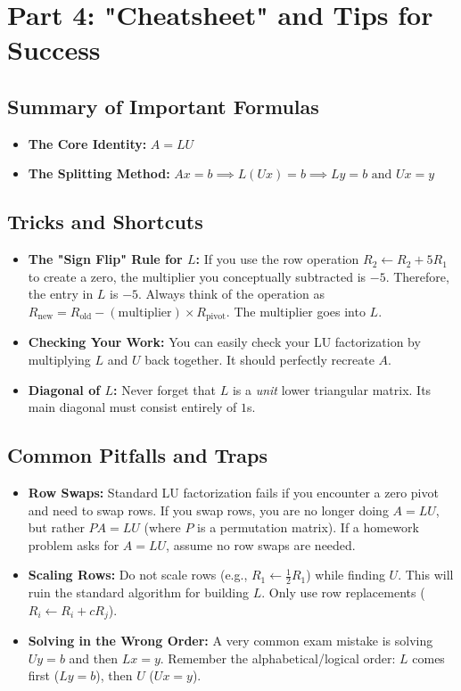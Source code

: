 \documentclass[11pt]{article}
\begin{document}
\newpage
\section{Part 4: "Cheatsheet" and Tips for Success}

\subsection{Summary of Important Formulas}
\begin{itemize}
    \item \textbf{The Core Identity:} $A = LU$
    \item \textbf{The Splitting Method:} $Ax = b \implies L(Ux) = b \implies Ly = b \text{ and } Ux = y$
\end{itemize}

\subsection{Tricks and Shortcuts}
\begin{itemize}
    \item \textbf{The "Sign Flip" Rule for $L$:} If you use the row operation $R_2 \leftarrow R_2 + 5R_1$ to create a zero, the multiplier you conceptually subtracted is $-5$. Therefore, the entry in $L$ is $-5$. Always think of the operation as $R_{\text{new}} = R_{\text{old}} - (\text{multiplier}) \times R_{\text{pivot}}$. The multiplier goes into $L$.
    \item \textbf{Checking Your Work:} You can easily check your LU factorization by multiplying $L$ and $U$ back together. It should perfectly recreate $A$.
    \item \textbf{Diagonal of $L$:} Never forget that $L$ is a \textit{unit} lower triangular matrix. Its main diagonal must consist entirely of $1$s.
\end{itemize}

\subsection{Common Pitfalls and Traps}
\begin{itemize}
    \item \textbf{Row Swaps:} Standard LU factorization fails if you encounter a zero pivot and need to swap rows. If you swap rows, you are no longer doing $A=LU$, but rather $PA=LU$ (where $P$ is a permutation matrix). If a homework problem asks for $A=LU$, assume no row swaps are needed.
    \item \textbf{Scaling Rows:} Do not scale rows (e.g., $R_1 \leftarrow \frac{1}{2}R_1$) while finding $U$. This will ruin the standard algorithm for building $L$. Only use row replacements ($R_i \leftarrow R_i + cR_j$).
    \item \textbf{Solving in the Wrong Order:} A very common exam mistake is solving $Uy = b$ and then $Lx = y$. Remember the alphabetical/logical order: $L$ comes first ($Ly=b$), then $U$ ($Ux=y$).
\end{itemize}
\end{document}
